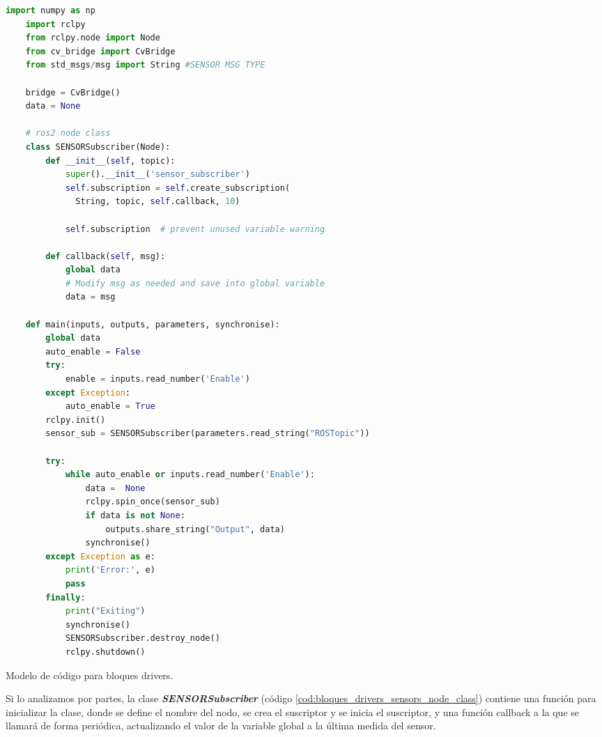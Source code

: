 \begin{code}[H]
  \begin{lstlisting}[language=python]
    import numpy as np
    import rclpy
    from rclpy.node import Node
    from cv_bridge import CvBridge
    from std_msgs/msg import String #SENSOR MSG TYPE
    
    bridge = CvBridge()
    data = None
    
    # ros2 node class
    class SENSORSubscriber(Node):
        def __init__(self, topic):
            super().__init__('sensor_subscriber')
            self.subscription = self.create_subscription(
              String, topic, self.callback, 10)

            self.subscription  # prevent unused variable warning
    
        def callback(self, msg):
            global data
            # Modify msg as needed and save into global variable
            data = msg

    def main(inputs, outputs, parameters, synchronise):
        global data
        auto_enable = False
        try:
            enable = inputs.read_number('Enable')
        except Exception:
            auto_enable = True
        rclpy.init()
        sensor_sub = SENSORSubscriber(parameters.read_string("ROSTopic"))

        try:
            while auto_enable or inputs.read_number('Enable'):
                data =  None
                rclpy.spin_once(sensor_sub)
                if data is not None:
                    outputs.share_string("Output", data)
                synchronise()
        except Exception as e:
            print('Error:', e)
            pass
        finally:
            print("Exiting")
            synchronise()     
            SENSORSubscriber.destroy_node()
            rclpy.shutdown()
  \end{lstlisting}
  \caption[Modelo de código para bloques drivers]{Modelo de código para bloques drivers.}
  \label{cod:bloques_drivers_sensors_total}
\end{code}

Si lo analizamos por partes, la clase \textbf{\textit{SENSORSubscriber}} (código \ref{cod:bloques_drivers_sensors_node_class}) contiene una función
para inicializar la clase, donde se define el nombre del nodo, se crea el suscriptor y se inicia el suscriptor, y una función callback a la que se
llamará de forma periódica, actualizando el valor de la variable global a la última medida del sensor.

